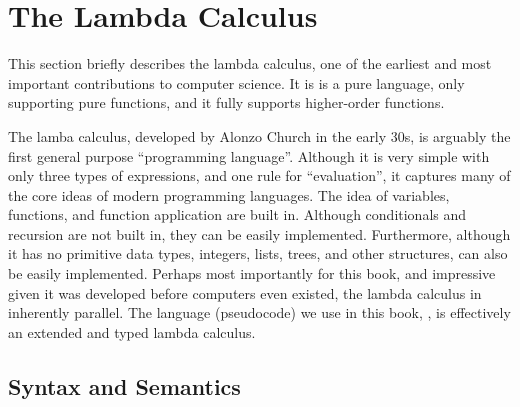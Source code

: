 \chapter{The Lambda Calculus}
\label{ch:lambda-calculus}

\begin{cluster}
\label{grp:prmbl:lambda-calculus::describes}

\begin{preamble}
\label{prmbl:lambda-calculus::describes}
This section briefly describes the lambda calculus, one of the
earliest and most important contributions to computer science.   It is
is a pure language, only supporting pure functions, and it fully
supports higher-order functions.

\end{preamble}
\end{cluster}

\begin{cluster}
\label{grp:grm:lambda-calculus::lamba}

\begin{gram}
\label{grm:lambda-calculus::lamba}
  The lamba calculus, developed by Alonzo Church in the early 30s, is arguably
  the first general purpose ``programming language''.  
  Although it is very simple with
  only three types of expressions, and one rule for ``evaluation'', it
  captures many of the core ideas of modern
  programming languages.  
  The idea of variables, functions, and
  function application are built in.  
  Although conditionals and
  recursion are not built in, they can be easily implemented.
  Furthermore, although it has no primitive data types, integers,
  lists, trees, and other structures, can also be easily implemented.    
  Perhaps most importantly for this book, and impressive given it was
  developed before computers even existed, the lambda calculus in
  inherently parallel.
  The language (pseudocode) we use in this book, \PML{}, is
  effectively an extended and typed lambda calculus.

\end{gram}
\end{cluster}


\section{Syntax and Semantics}
\label{sec:lc::syntax-and-semantics}

